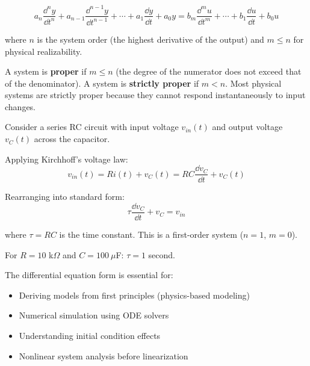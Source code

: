 \begin{equation}
\boxed{a_n\frac{\dd^n y}{\dd t^n} + a_{n-1}\frac{\dd^{n-1} y}{\dd t^{n-1}} + \cdots + a_1\frac{\dd y}{\dd t} + a_0 y = b_m\frac{\dd^m u}{\dd t^m} + \cdots + b_1\frac{\dd u}{\dd t} + b_0 u}
\label{eq:general_ode}
\end{equation}

where $n$ is the system order (the highest derivative of the output) and $m \leq n$ for physical realizability.

\begin{definitionbox}[title=Proper and Strictly Proper Systems]
A system is \textbf{proper} if $m \leq n$ (the degree of the numerator does not exceed that of the denominator). A system is \textbf{strictly proper} if $m < n$. Most physical systems are strictly proper because they cannot respond instantaneously to input changes.
\end{definitionbox}

\begin{examplebox}[title=Example 4.1: RC Circuit Differential Equation]
Consider a series RC circuit with input voltage $v_{in}(t)$ and output voltage $v_C(t)$ across the capacitor.

Applying Kirchhoff's voltage law:
\begin{equation}
v_{in}(t) = Ri(t) + v_C(t) = RC\frac{\dd v_C}{\dd t} + v_C(t)
\end{equation}

Rearranging into standard form:
\begin{equation}
\tau\frac{\dd v_C}{\dd t} + v_C = v_{in}
\end{equation}

where $\tau = RC$ is the time constant. This is a first-order system ($n = 1$, $m = 0$).

For $R = 10$ k$\Omega$ and $C = 100\ \mu$F: $\tau = 1$ second.
\end{examplebox}

The differential equation form is essential for:
\begin{itemize}
    \item Deriving models from first principles (physics-based modeling)
    \item Numerical simulation using ODE solvers
    \item Understanding initial condition effects
    \item Nonlinear system analysis before linearization
\end{itemize}

